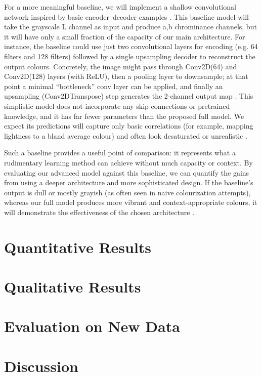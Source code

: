 \documentclass{article} %
\begin{document}
For a more meaningful baseline, we will implement a shallow convolutional network inspired by basic encoder–decoder examples \citep{leatvanich2025image}. This baseline model will take the grayscale L channel as input and produce a,b chrominance channels, but it will have only a small fraction of the capacity of our main architecture. For instance, the baseline could use just two convolutional layers for encoding (e.g. 64 filters and 128 filters) followed by a single upsampling decoder to reconstruct the output colours. Concretely, the image might pass through Conv2D(64) and Conv2D(128) layers (with ReLU), then a pooling layer to downsample; at that point a minimal “bottleneck” conv layer can be applied, and finally an upsampling (Conv2DTranspose) step generates the 2-channel output map \citep{leatvanich2025image}. This simplistic model does not incorporate any skip connections or pretrained knowledge, and it has far fewer parameters than the proposed full model. We expect its predictions will capture only basic correlations (for example, mapping lightness to a bland average colour) and often look desaturated or unrealistic \citep{rosebrock2019bwcolorization}.

Such a baseline provides a useful point of comparison: it represents what a rudimentary learning method can achieve without much capacity or context. By evaluating our advanced model against this baseline, we can quantify the gains from using a deeper architecture and more sophisticated design. If the baseline’s output is dull or mostly grayish (as often seen in naive colourization attempts), whereas our full model produces more vibrant and context-appropriate colours, it will demonstrate the effectiveness of the chosen architecture \citep{rosebrock2019bwcolorization}.

\section{Quantitative Results}
\label{quant_results}

\section{Qualitative Results}
\label{qual_results}

\section{Evaluation on New Data}
\label{new_data}

\section{Discussion}
\label{discussion}
\end{document}
